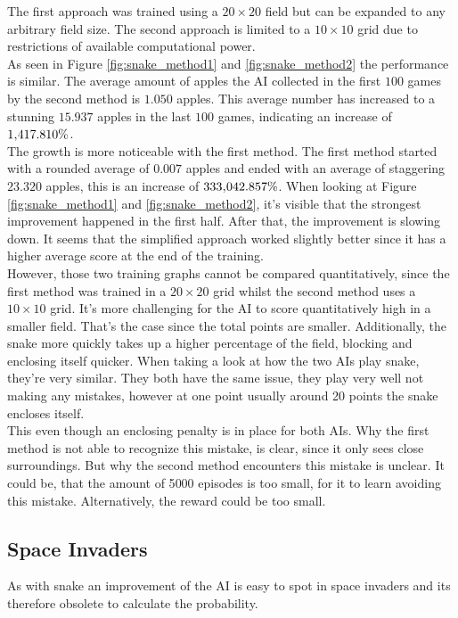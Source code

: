 \documentclass[12pt]{article}
\begin{document}
The first approach was trained using a $20{\times}20$ field but can be expanded to any arbitrary field size. The second approach is limited to a $10{\times}10$ grid due to restrictions of available computational power. \\
As seen in Figure \ref{fig:snake_method1} and \ref{fig:snake_method2} the performance is similar. 
The average amount of apples the AI collected in the first $100$ games by the second method is $1.050$ apples. This average number has increased to a stunning $15.937$ apples in the last $100$ games, indicating an increase of $1\textsc{\char13}417.810\%$. \\
The growth is more noticeable with the first method. The first method started with a rounded average of $0.007$ apples and ended with an average of staggering $23.320$ apples, this is an increase of $333\textsc{\char13}042.857\%$. When looking at Figure \ref{fig:snake_method1} and \ref{fig:snake_method2}, it's visible that the strongest improvement happened in the first half. After that, the improvement is slowing down. It seems that the simplified approach worked slightly better since it has a higher average score at the end of the training. \\
However, those two training graphs cannot be compared quantitatively, since the first method was trained in a $20{\times}20$ grid whilst the second method uses a $10{\times}10$ grid. It's more challenging for the AI to score quantitatively high in a smaller field. That's the case since the total points are smaller. Additionally, the snake more quickly takes up a higher percentage of the field, blocking and enclosing itself quicker. When taking a look at how the two AIs play snake, they're very similar. They both have the same issue, they play very well not making any mistakes, however at one point usually around 20 points the snake encloses itself. \\
This even though an enclosing penalty is in place for both AIs. Why the first method is not able to recognize this mistake, is clear, since it only sees close surroundings. But why the second method encounters this mistake is unclear. It could be, that the amount of 5\textsc{}000 \glspl{episode} is too small, for it to learn avoiding this mistake. Alternatively, the reward could be too small.
\subsection{Space Invaders}
As with snake an improvement of the \gls{AI} is easy to spot in space invaders and its therefore obsolete to calculate the probability. 
\end{document}
